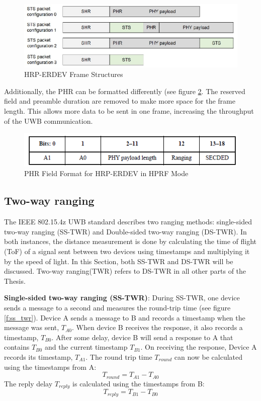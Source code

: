 \begin{figure}[ht!]
\centering
\includegraphics[width=\linewidth]{graphics/HRP_ERDEV_frame_structures.jpg}
\caption{HRP-ERDEV Frame Structures \cite{hsu_2021}}
\label{f:HRP-erdev frame}
\end{figure}

Additionally, the PHR can be formatted differently (see figure \ref{f:PHR 4z}. 
The reserved field and preamble duration are removed to make more space for the frame length. 
This allows more data to be sent in one frame, increasing the throughput of the UWB communication.

\begin{figure}[ht!]
\centering
\includegraphics[width=\linewidth]{graphics/HRP_ERDEV_HPRF_mode_PHR.png}
\caption{PHR Field Format for HRP-ERDEV in HPRF Mode \cite{IEEE4z}}
\label{f:PHR 4z}
\end{figure}


\subsection{Two-way ranging}
\label{ss:two_way_ranging}
The IEEE 802.15.4z UWB standard describes two ranging methods: single-sided two-way ranging (SS-TWR) and Double-sided two-way ranging (DS-TWR).
In both instances, the distance measurement is done by calculating the time of flight (ToF) of a signal sent between two devices using timestamps and multiplying it by the speed of light. 
In this Section, both SS-TWR and DS-TWR will be discussed.
Two-way ranging(TWR) refers to DS-TWR in all other parts of the Thesis.

\textbf{Single-sided two-way ranging (SS-TWR)}:
During  SS-TWR, one device sends a message to a second and measures the round-trip time (see figure \ref{f:ss_twr}).
Device A sends a message to B and records a timestamp when the message was sent, $T_{A0}$.
When device B receives the response, it also records a timestamp, $T_{B0}$.
After some delay, device B will send a response to A that contains $T_{B0}$ and the current timestamp $T_{B1}$.
On receiving the response, Device A records its timestamp, $T_{A1}$.
The round trip time $T_{round}$ can now be calculated using the timestamps from A:
\begin{equation}
	\mbox{$T_{round}$} =
	\mbox{$T_{A1} - T_{A0}$}
\end{equation}
The reply delay $T_{reply}$ is calculated using the timestamps from B:
\begin{equation}
	\mbox{$T_{reply}$} =
	\mbox{$T_{B1} - T_{B0}$}
\end{equation}

